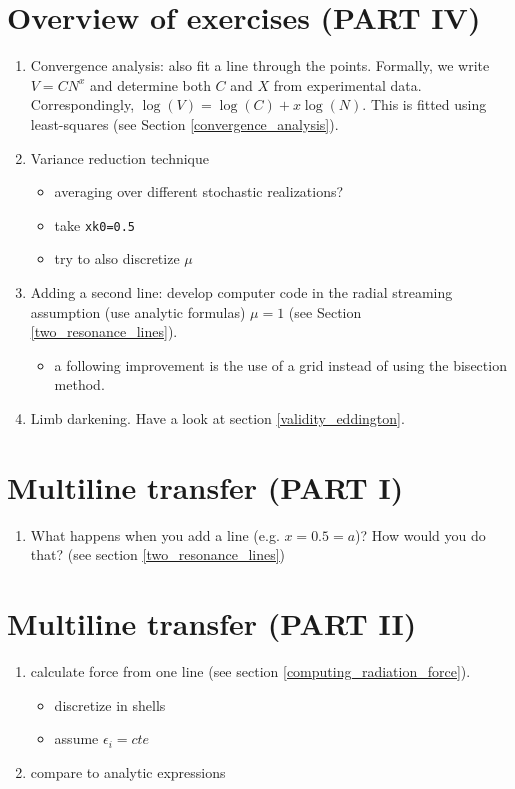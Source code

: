 \documentclass[../main/main.tex]{subfiles}
\begin{document}
\newpage
\section{Overview of exercises (PART IV)}
\label{Overview_Part_4}

\begin{enumerate}
\item Convergence analysis: also fit a line through the points. Formally, we write $V = CN^x$ and determine both $C$ and $X$ from experimental data. Correspondingly, $\log(V) = \log(C) + x\log(N)$. This is fitted using least-squares (see Section \underline{\ref{convergence_analysis}}).

\item Variance reduction technique
\begin{itemize}
\item averaging over different stochastic realizations?
\item take \texttt{xk0=0.5}
\item try to also discretize $\mu$
\end{itemize}

\item Adding a second line: develop computer code in the radial streaming assumption (use analytic formulas) $\mu = 1$ (see Section \underline{\ref{two_resonance_lines}}).
\begin{itemize}
\item a following improvement is the use of a grid instead of using the bisection method.
\end{itemize}

\item Limb darkening. Have a look at section \ref{validity_eddington}.

\end{enumerate}

\section{Multiline transfer (PART I)}
\begin{enumerate}
\item What happens when you add a line (e.g. \@ $x=0.5=a$)? How would you do that? (see section \underline{\ref{two_resonance_lines}}) 
\end{enumerate}

\section{Multiline transfer (PART II)}
\begin{enumerate}
\item calculate force from one line (see section \underline{\ref{computing_radiation_force}}). 
\begin{itemize}
\item discretize in shells
\item assume $\epsilon_i = cte$
\end{itemize}
\item compare to analytic expressions
\end{enumerate}
\end{document}
